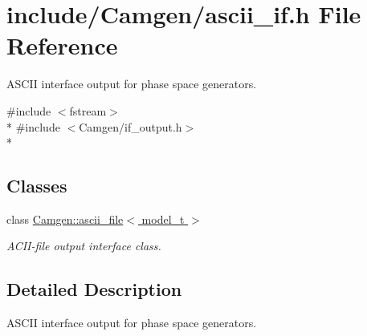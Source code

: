 \hypertarget{a00582}{\section{include/\-Camgen/ascii\-\_\-if.h File Reference}
\label{a00582}
}


A\-S\-C\-I\-I interface output for phase space generators.  


{\ttfamily \#include $<$fstream$>$}\\*
{\ttfamily \#include $<$Camgen/if\-\_\-output.\-h$>$}\\*
\subsection*{Classes}
\begin{DoxyCompactItemize}
\item 
class \hyperlink{a00017}{Camgen\-::ascii\-\_\-file$<$ model\-\_\-t $>$}
\begin{DoxyCompactList}\small\item\em A\-C\-I\-I-\/file output interface class. \end{DoxyCompactList}\end{DoxyCompactItemize}


\subsection{Detailed Description}
A\-S\-C\-I\-I interface output for phase space generators. 
